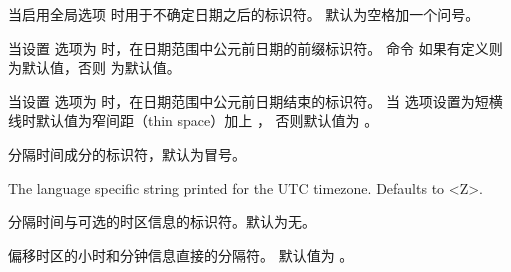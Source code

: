 \begin{ltxsyntax}

当启用全局选项  时用于不确定日期之后的标识符。
默认为空格加一个问号。


当设置  选项为  时，在日期范围中公元前日期的前缀标识符。
命令  如果有定义则为默认值，否则  为默认值。


当设置  选项为  时，在日期范围中公元前日期结束的标识符。
当  选项设置为短横线时默认值为窄间距（thin space）加上 ，
否则默认值为 。


分隔时间成分的标识符，默认为冒号。

The language specific string printed for the UTC timezone. Defaults to <Z>.

分隔时间与可选的时区信息的标识符。默认为无。


偏移时区的小时和分钟信息直接的分隔符。
默认值为 。



\end{ltxsyntax}
